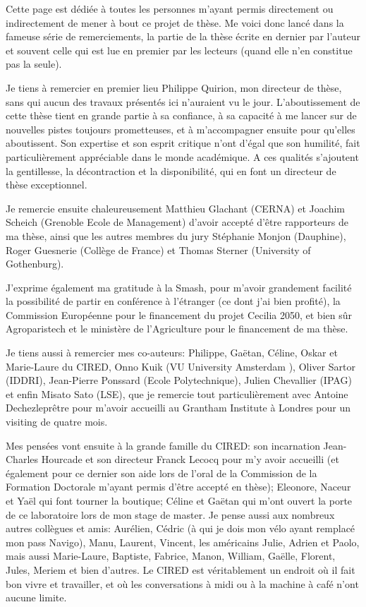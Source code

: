 

Cette page est dédiée à toutes les personnes m'ayant permis directement ou indirectement de mener à bout ce projet de thèse.
Me voici donc lancé dans la fameuse série de remerciements, la partie de la thèse écrite en dernier par l'auteur et souvent celle qui est lue en premier par les lecteurs (quand elle n'en constitue pas la seule).  
 
Je tiens à remercier en premier lieu Philippe Quirion, mon directeur de thèse, sans qui aucun des travaux présentés ici n'auraient vu le jour.
L'aboutissement de cette thèse tient en grande partie à sa confiance, à sa capacité à me lancer sur de nouvelles pistes toujours prometteuses, et à m'accompagner ensuite pour qu'elles aboutissent.  
Son expertise et son esprit critique n'ont d'égal que son humilité, fait particulièrement appréciable dans le monde académique. 
A ces qualités s'ajoutent la gentillesse, la décontraction et la disponibilité, qui en font un directeur de thèse exceptionnel.

Je remercie ensuite chaleureusement Matthieu Glachant (CERNA) et Joachim Scheich (Grenoble Ecole de Management) d'avoir accepté d'être rapporteurs de ma thèse, ainsi que les autres membres du jury Stéphanie Monjon (Dauphine), Roger Guesnerie (Collège de France) et Thomas Sterner (University of Gothenburg).

J'exprime également ma gratitude à la Smash, pour m'avoir grandement facilité la possibilité de partir en conférence à l'étranger (ce dont j'ai bien profité), la Commission Européenne pour le financement du projet Cecilia 2050, et bien sûr Agroparistech et le ministère de l'Agriculture pour le financement de ma thèse. 

Je tiens aussi à remercier mes co-auteurs: Philippe, Gaëtan, Céline, Oskar et Marie-Laure du CIRED, Onno Kuik (VU University Amsterdam ), Oliver Sartor (IDDRI), Jean-Pierre Ponssard (Ecole Polytechnique), Julien Chevallier (IPAG) et enfin Misato Sato (LSE), que je remercie tout particulièrement avec Antoine Dechezleprêtre pour m'avoir accueilli au Grantham Institute à Londres pour un visiting de quatre mois.

Mes pensées vont ensuite à la grande famille du CIRED: son incarnation Jean-Charles Hourcade et son  directeur Franck Lecocq pour m'y avoir accueilli (et également pour ce dernier son aide lors de l'oral de la Commission de la Formation Doctorale m'ayant permis d'être accepté en thèse); Eleonore, Naceur et Yaël qui font tourner la boutique; Céline et Gaëtan qui m'ont ouvert la porte de ce laboratoire lors de mon stage de master. 
Je pense aussi aux nombreux autres collègues et amis: Aurélien, Cédric (à qui je dois mon vélo ayant remplacé mon pass Navigo), Manu, Laurent, Vincent, les américains Julie, Adrien et Paolo, mais aussi Marie-Laure, Baptiste, Fabrice, Manon, William, Gaëlle, Florent, Jules, Meriem et bien d'autres.
Le CIRED est véritablement un endroit où il fait bon vivre et travailler, et où les conversations à midi ou à la machine à café n'ont aucune limite. 


